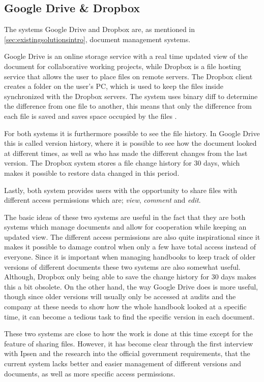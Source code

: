 \subsection{Google Drive \& Dropbox}\label{sec:DropDrive}
The systems Google Drive and Dropbox are, as mentioned in \cref{sec:existingsolutionsintro}, document management systems.

Google Drive is an online storage service with a real time updated view of the document for collaborative working projects, while Dropbox is a file hosting service that allows the user to place files on remote servers.
The Dropbox client creates a folder on the user's PC, which is used to keep the files inside synchronized with the Dropbox servers. 
The system uses binary diff to determine the difference from one file to another, this means that only the difference from each file is saved and saves space occupied by the files \cite{DropboxDiff}.

For both systems it is furthermore possible to see the file history.
In Google Drive this is called version history, where it is possible to see how the document looked at different times, as well as who has made the different changes from the last version.
The Dropbox system stores a file change history for 30 days, which makes it possible to restore data changed in this period.

Lastly, both system provides users with the opportunity to share files with different access permissions which are; \textit{view}, \textit{comment} and \textit{edit}.

The basic ideas of these two systems are useful in the fact that they are both systems which manage documents and allow for cooperation while keeping an updated view.
The different access permissions are also quite inspirational since it makes it possible to damage control when only a few have total access instead of everyone.
Since it is important when managing handbooks to keep track of older versions of different documents these two systems are also somewhat useful.
Although, Dropbox only being able to save the change history for 30 days makes this a bit obsolete.
On the other hand, the way Google Drive does is more useful, though since older versions will usually only be accessed at audits and the company at these needs to show how the whole handbook looked at a specific time, it can become a tedious task to find the specific version in each document.

These two systems are close to how the work is done at this time except for the feature of sharing files.
However, it has become clear through the first interview with Ipsen and the research into the official government requirements, that the current system lacks better and easier management of different versions and documents, as well as more specific access permissions.
